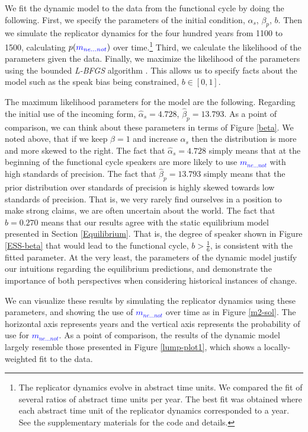 \documentclass[linguex]{sp}
\theoremstyle{definition} \newtheorem{definition}{Definition}
\begin{document}
We fit the dynamic model to the data from the functional cycle by doing the following. First, we  specify the parameters of the initial condition, $\alpha_{s}$, $\beta_p$, $b$. Then we  simulate the replicator dynamics for the four hundred years from 1100 to 1500, calculating $p(\textcolor{blue}{m_{ne...not}})$ over time.\footnote{The replicator dynamics evolve in abstract time units. We compared the fit of several ratios of abstract time units per year. The best fit was obtained where each abstract time unit of the replicator dynamics corresponded to a year. See the supplementary materials for the code and details.} Third, we calculate the likelihood of the parameters given the data. Finally, we maximize the likelihood of the parameters using the bounded \emph{L-BFGS} algorithm \citep{byrd1995}. This allows us to specify facts about the model such as the speak bias being constrained,  $b \in [0,1]$.

The maximum likelihood parameters for the model are the following.  Regarding the initial use of the incoming form, $\hat{\alpha}_{s} = 4.728$, $\hat{\beta}_p =  13.793$. As a point of comparison, we can think about these parameters in terms of Figure \ref{beta}. We noted above, that if we keep $\beta=1$ and increase $\alpha_s$ then the distribution is more and more skewed to the right. The fact that $\hat{\alpha}_{s} = 4.728$ simply means that at the beginning of the functional cycle speakers are more likely to use \textcolor{blue}{$m_{ne...not}$} with high standards of precision. The fact that $\hat{\beta}_p =  13.793$ simply means that the prior distribution over standards of precision is highly skewed towards low standards of precision. That is, we very rarely find ourselves in a position to make strong claims, we are often uncertain about the world. The fact that $\hat{b}=0.270$ means that our results agree with the static equilibrium model presented in Section \ref{Equilibrium}. That is, the degree of speaker shown in Figure \ref{ESS-beta} that would lead to the functional cycle, $b > \frac{1}{6}$, is consistent with the fitted parameter. At the very least, the parameters of the dynamic model justify our intuitions regarding the equilibrium predictions, and demonstrate the importance of both perspectives when considering historical instances of change.

We can visualize these results by simulating the replicator dynamics using these parameters, and showing the use of \textcolor{blue}{$m_{ne...not}$} over time as in Figure \ref{m2-sol}. The horizontal axis represents years and the vertical axis represents the probability of use for \textcolor{blue}{$m_{ne...not}$}.  As a point of comparison, the results of the dynamic model largely resemble those presented in Figure \ref{lump-plot1}, which shows a locally-weighted fit to the data.
\end{document}
